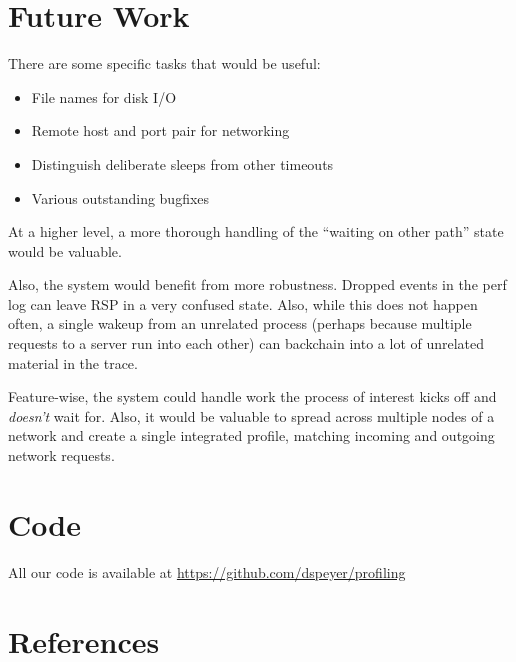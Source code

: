 \documentclass[10pt]{article}
\begin{document}
\section{Future Work}

There are some specific tasks that would be useful:

\begin{itemize}
\item File names for disk I/O
\item Remote host and port pair for networking
\item Distinguish deliberate sleeps from other timeouts
\item Various outstanding bugfixes
\end{itemize}

At a higher level, a more thorough handling of the ``waiting on other path'' state would be valuable.

Also, the system would benefit from more robustness.  Dropped events in the perf log can leave RSP in a very confused state.  Also, while this does not happen often, a single wakeup from an unrelated process (perhaps because multiple requests to a server run into each other) can backchain into a lot of unrelated material in the trace.

Feature-wise, the system could handle work the process of interest kicks off and \emph{doesn't} wait for.  Also, it would be valuable to spread across multiple nodes of a network and create a single integrated profile, matching incoming and outgoing network requests.


\section{Code}

All our code is available at \url{https://github.com/dspeyer/profiling}

\section{References}
\end{document}
